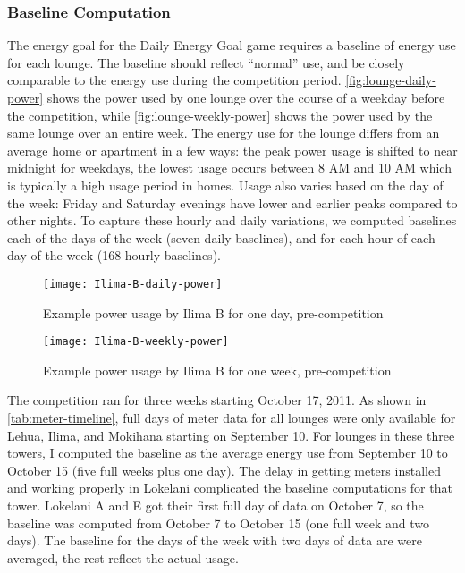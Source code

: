 \subsubsection{Baseline Computation}
\label{sec:baseline-computation}

The energy goal for the Daily Energy Goal game requires a baseline of energy use for each lounge. The baseline should reflect ``normal'' use, and be closely comparable to the energy use during the competition period. \autoref{fig:lounge-daily-power} shows the power used by one lounge over the course of a weekday before the competition, while \autoref{fig:lounge-weekly-power} shows the power used by the same lounge over an entire week. The energy use for the lounge differs from an average home or apartment in a few ways: the peak power usage is shifted to near midnight for weekdays, the lowest usage occurs between 8 AM and 10 AM which is typically a high usage period in homes. Usage also varies based on the day of the week: Friday and Saturday evenings have lower and earlier peaks compared to other nights. To capture these hourly and daily variations, we computed baselines each of the days of the week (seven daily baselines), and for each hour of each day of the week (168 hourly baselines).

\begin{figure}[htbp]
	\centering
		\texttt{[image: Ilima-B-daily-power]}
		\caption{Example power usage by Ilima B for one day, pre-competition}
\label{fig:lounge-daily-power}
\end{figure}

\begin{figure}[htbp]
	\centering
		\texttt{[image: Ilima-B-weekly-power]}
		\caption{Example power usage by Ilima B for one week, pre-competition}
\label{fig:lounge-weekly-power}
\end{figure}

The competition ran for three weeks starting October 17, 2011. As shown in \autoref{tab:meter-timeline}, full days of meter data for all lounges were only available for Lehua, Ilima, and Mokihana starting on September 10. For lounges in these three towers, I computed the baseline as the average energy use from September 10 to October 15 (five full weeks plus one day). The delay in getting meters installed and working properly in Lokelani complicated the baseline computations for that tower. Lokelani A and E got their first full day of data on October 7, so the baseline was computed from October 7 to October 15 (one full week and two days). The baseline for the days of the week with two days of data are were averaged, the rest reflect the actual usage.

